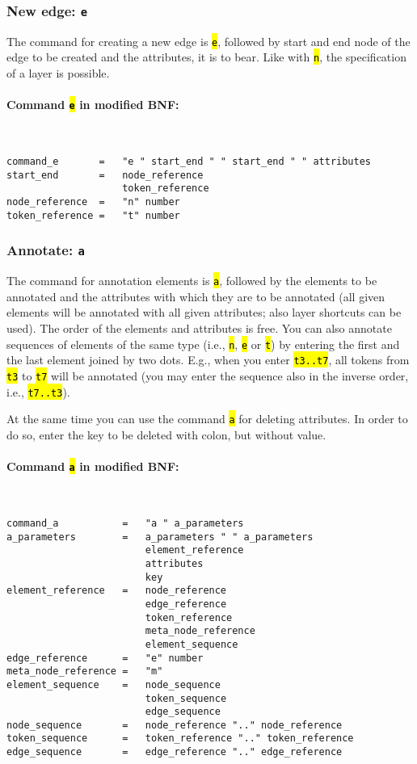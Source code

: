 \documentclass[12pt]{scrartcl}
\newcommand{\code}[1]{\hl{\texttt{#1}}}
\begin{document}
\subsubsection{New edge: \texttt{e}}

The command for creating a new edge is \code{e}, followed by start and end node of the edge to be created and the attributes, it is to bear.
Like with \code{n}, the specification of a layer is possible.

\paragraph*{Command \code{e} in modified BNF:}
~
\begin{lstlisting}
command_e       =   "e " start_end " " start_end " " attributes
start_end       =   node_reference
                    token_reference
node_reference  =   "n" number
token_reference =   "t" number
\end{lstlisting}


\subsubsection{Annotate: \texttt{a}}\label{befehl-a}

The command for annotation elements is \code{a}, followed by the elements to be annotated and the attributes with which they are to be annotated (all given elements will be annotated with all given attributes; also layer shortcuts can be used).
The order of the elements and attributes is free.
You can also annotate sequences of elements of the same type (i.e., \code{n}, \code{e} or \code{t}) by entering the first and the last element joined by two dots.
E.g., when you enter \code{t3..t7}, all tokens from \code{t3} to \code{t7} will be annotated (you may enter the sequence also in the inverse order, i.e., \code{t7..t3}).

At the same time you can use the command \code{a} for deleting attributes.
In order to do so, enter the key to be deleted with colon, but without value.

\paragraph*{Command \code{a} in modified BNF:}
~
\begin{lstlisting}
command_a           =   "a " a_parameters
a_parameters        =   a_parameters " " a_parameters
                        element_reference
                        attributes
                        key
element_reference   =   node_reference
                        edge_reference
                        token_reference
                        meta_node_reference
                        element_sequence
edge_reference      =   "e" number
meta_node_reference =   "m"
element_sequence    =   node_sequence
                        token_sequence
                        edge_sequence
node_sequence       =   node_reference ".." node_reference
token_sequence      =   token_reference ".." token_reference
edge_sequence       =   edge_reference ".." edge_reference
\end{lstlisting}
\end{document}
